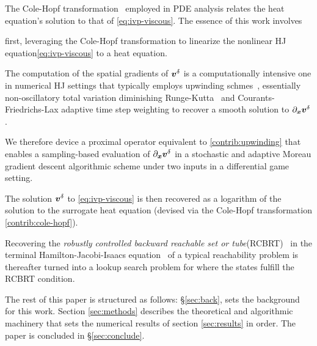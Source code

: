 The Cole-Hopf transformation~\citet{EvansPDEBook, Chaudhari2018} employed in PDE analysis relates the heat equation's solution to that of \eqref{eq:ivp-viscous}. The essence of this work involves
%
\begin{inparaenum}[(i)]
	\item first, leveraging the Cole-Hopf transformation to linearize the nonlinear HJ equation\eqref{eq:ivp-viscous} to a heat equation. \label{contrib:cole-hopf}
	\item The computation of the spatial gradients of $\bm{v}^\delta$ is a computationally intensive one in numerical HJ settings that typically employs upwinding schmes~\citet{LevelSetsBook}, essentially non-oscillatory total variation diminishing Runge-Kutta~\citet{OsherShuENO} and Courants-Friedrichs-Lax adaptive time step weighting to recover a smooth solution to $\partial_{\bm{x}}\bm{v}^\delta$. \label{contrib:upwinding}
	\item We  therefore device a proximal operator equivalent to \ref{contrib:upwinding} that enables a sampling-based evaluation of $\partial_{\bm{x}}\bm{v}^\delta$ in a stochastic and adaptive Moreau gradient descent algorithmic scheme under two inputs in a differential game setting.  
	\item The solution $\bm{v}^\delta$ to \eqref{eq:ivp-viscous} is then recovered as a logarithm of the solution to the surrogate heat equation (devised via the Cole-Hopf transformation \ref{contrib:cole-hopf}). 
	\item Recovering the \textit{robustly controlled backward reachable set or tube}(RCBRT)~\citet{Mitchell2020} in the terminal Hamilton-Jacobi-Isaacs equation~\citet{Isaacs1965, Mitchell2005, MoluxLevPyCDC, LevelSetTOMS} of a typical reachability problem is thereafter turned into a lookup search problem for where the states fulfill the RCBRT condition. %
\end{inparaenum} 

The rest of this paper is structured as follows: \S \ref{sec:back}, sets the background for this work. Section \ref{sec:methods} describes the theoretical and algorithmic machinery that sets the numerical results of section \ref{sec:results} in order. The paper is concluded in \S \ref{sec:conclude}. 